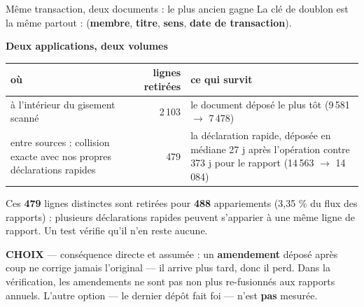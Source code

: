 \documentclass[11pt,aspectratio=169]{beamer}
\newcommand{\defl}[1]{{\scriptsize\color{black!55}#1}}
\newcommand{\choixbox}[1]{%
  \colorbox{alertred!8}{\parbox{\dimexpr\linewidth-8pt}{\scriptsize
    \textbf{\textcolor{alertred}{CHOIX}}\; --- #1}}}
\begin{document}
\begin{frame}{Même transaction, deux documents : le plus ancien gagne}
  \vspace{0pt}
  {\footnotesize La clé de doublon est la même partout :
   (\textbf{membre}, \textbf{titre}, \textbf{sens}, \textbf{date de transaction}).}\par\vspace{2mm}
  {\footnotesize\textbf{Deux applications, deux volumes}}\par\vspace{1mm}
  {\scriptsize
  \begin{tabular}{@{}>{\raggedright\arraybackslash}p{}r>{\raggedright\arraybackslash}p{}@{}}
    \toprule
    \textbf{où} & \textbf{lignes retirées} & \textbf{ce qui survit}\\
    \midrule
    à l'intérieur du gisement scanné
      & 2\,103 & le document déposé le plus tôt \defl{(9\,581 $\rightarrow$ 7\,478)}\\
    \addlinespace[0.6mm]
    entre sources : collision exacte avec nos propres déclarations rapides
      & \phantom{0}479 & la déclaration rapide, déposée en médiane 27 j après l'opération
        contre 373 j pour le rapport \defl{(14\,563 $\rightarrow$ 14\,084)}\\
    \bottomrule
  \end{tabular}}\par\vspace{2mm}
  {\scriptsize Ces \textbf{479} lignes distinctes sont retirées pour \textbf{488} appariements
   \defl{(3,35 \% du flux des rapports)} : plusieurs déclarations rapides peuvent s'apparier à
   une même ligne de rapport. Un test vérifie qu'il n'en reste aucune.}\par\vspace{2mm}
  \choixbox{conséquence directe et assumée : un \textbf{amendement} déposé après coup ne
  corrige jamais l'original --- il arrive plus tard, donc il perd. Dans la vérification, les
  amendements ne sont pas non plus re-fusionnés aux rapports annuels. L'autre option --- le
  dernier dépôt fait foi --- n'est \textbf{pas} mesurée.}
\end{frame}
\end{document}
